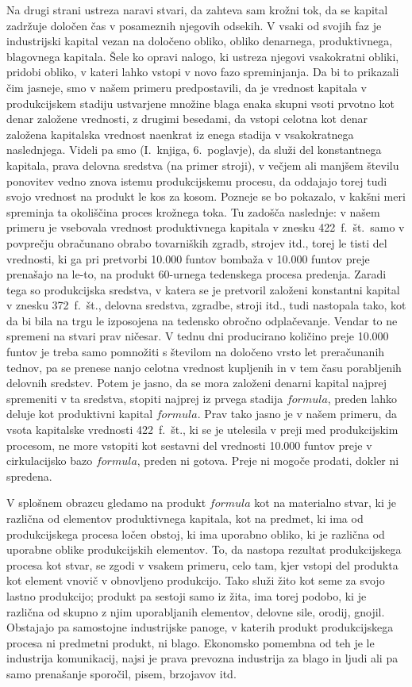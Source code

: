 \documentclass[a5paper]{scrbook}
\begin{document}
Na drugi strani ustreza naravi stvari, da zahteva sam krožni tok, da se kapital zadržuje določen čas v posameznih njegovih odsekih. V vsaki od svojih faz je industrijski kapital vezan na določeno obliko, obliko denarnega, produktivnega, blagovnega kapitala. Šele ko opravi nalogo, ki ustreza njegovi vsakokratni obliki, pridobi obliko, v kateri lahko vstopi v novo fazo spreminjanja. Da bi to prikazali čim jasneje, smo v našem primeru predpostavili, da je vrednost kapitala v produkcijskem stadiju ustvarjene množine blaga enaka skupni vsoti prvotno kot denar založene vrednosti, z drugimi besedami, da vstopi celotna kot denar založena kapitalska vrednost naenkrat iz enega stadija v vsakokratnega naslednjega. Videli pa smo (I.~knjiga, 6.~poglavje), da služi del konstantnega kapitala, prava delovna sredstva (na primer stroji), v večjem ali manjšem številu ponovitev vedno znova istemu produkcijskemu procesu, da oddajajo torej tudi svojo vrednost na produkt le kos za kosom. Pozneje se bo pokazalo, v kakšni meri spreminja ta okoliščina proces krožnega toka. Tu zadošča naslednje: v našem primeru je vsebovala vrednost produktivnega kapitala v znesku 422~f.~št.\ samo v povprečju obračunano obrabo tovarniških zgradb, strojev itd., torej le tisti del vrednosti, ki ga pri pretvorbi 10.000 funtov bombaža v 10.000 funtov preje prenašajo na le-to, na produkt 60-urnega tedenskega procesa predenja. Zaradi tega so produkcijska sredstva, v katera se je pretvoril založeni konstantni kapital v znesku 372~f.~št., delovna sredstva, zgradbe, stroji itd., tudi nastopala tako, kot da bi bila na trgu le izposojena na tedensko obročno odplačevanje. Vendar to ne spremeni na stvari prav ničesar. V tednu dni producirano količino preje 10.000 funtov je treba samo pomnožiti s številom na določeno vrsto let preračunanih tednov, pa se prenese nanjo celotna vrednost kupljenih in v tem času porabljenih delovnih sredstev. Potem je jasno, da se mora založeni denarni kapital najprej spremeniti v ta sredstva, stopiti najprej iz prvega stadija \( formula \), preden lahko deluje kot produktivni kapital \( formula \). Prav tako jasno je v našem primeru, da vsota kapitalske vrednosti 422~f.~št., ki se je utelesila v preji med produkcijskim procesom, ne more vstopiti kot sestavni del vrednosti 10.000 funtov preje v cirkulacijsko bazo \( formula \), preden ni gotova. Preje ni mogoče prodati, dokler ni spredena.

V splošnem obrazcu gledamo na produkt \( formula \) kot na materialno stvar, ki je različna od elementov produktivnega kapitala, kot na predmet, ki ima od produkcijskega procesa ločen obstoj, ki ima uporabno obliko, ki je različna od uporabne oblike produkcijskih elementov. To, da nastopa rezultat produkcijskega procesa kot stvar, se zgodi v vsakem primeru, celo tam, kjer vstopi del produkta kot element vnovič v obnovljeno produkcijo. Tako služi žito kot seme za svojo lastno produkcijo; produkt pa sestoji samo iz žita, ima torej podobo, ki je različna od skupno z njim uporabljanih elementov, delovne sile, orodij, gnojil. Obstajajo pa samostojne industrijske panoge, v katerih produkt produkcijskega procesa ni predmetni produkt, ni blago. Ekonomsko pomembna od teh je le industrija komunikacij, najsi je prava prevozna industrija za blago in ljudi ali pa samo prenašanje sporočil, pisem, brzojavov itd.
\end{document}

